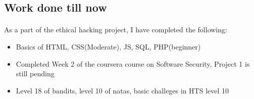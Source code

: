 \documentclass{article}
\begin{document}
\begin{itemize}
\subsection*{Work done till now}
\paragraph{}
As a part of the ethical hacking project, I have completed the following:
\begin{itemize}
    \item Basics of HTML, CSS(Moderate), JS, SQL, PHP(beginner)
    \item Completed Week 2 of the coursera course on Software Security, Project 1 is still pending
    \item Level 18 of bandits, level 10 of natas, basic challeges in HTS level 10
\end{itemize}


\end{itemize}
\end{document}
